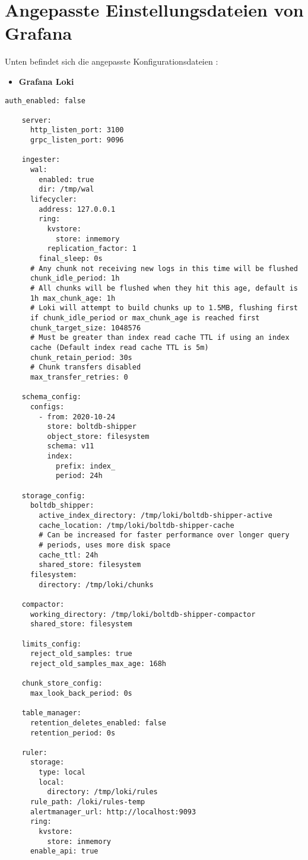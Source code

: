 \section{Angepasste Einstellungsdateien von Grafana}\label{appendix:AngepasstGrafana}

Unten befindet sich die angepasste Konfigurationsdateien \citep{Polinowski_PGL}:

\begin{itemize}[noitemsep]
    \item \textbf{Grafana Loki}
\end{itemize}

{
\begin{Verbatim}[frame=single]
    auth_enabled: false

    server:
      http_listen_port: 3100
      grpc_listen_port: 9096
    
    ingester:
      wal:
        enabled: true
        dir: /tmp/wal
      lifecycler:
        address: 127.0.0.1
        ring:
          kvstore:
            store: inmemory
          replication_factor: 1
        final_sleep: 0s
      # Any chunk not receiving new logs in this time will be flushed
      chunk_idle_period: 1h  
      # All chunks will be flushed when they hit this age, default is 
      1h max_chunk_age: 1h           
      # Loki will attempt to build chunks up to 1.5MB, flushing first 
      if chunk_idle_period or max_chunk_age is reached first
      chunk_target_size: 1048576  
      # Must be greater than index read cache TTL if using an index 
      cache (Default index read cache TTL is 5m)
      chunk_retain_period: 30s    
      # Chunk transfers disabled
      max_transfer_retries: 0     
    
    schema_config:
      configs:
        - from: 2020-10-24
          store: boltdb-shipper
          object_store: filesystem
          schema: v11
          index:
            prefix: index_
            period: 24h
    
    storage_config:
      boltdb_shipper:
        active_index_directory: /tmp/loki/boltdb-shipper-active
        cache_location: /tmp/loki/boltdb-shipper-cache
        # Can be increased for faster performance over longer query 
        # periods, uses more disk space
        cache_ttl: 24h        
        shared_store: filesystem
      filesystem:
        directory: /tmp/loki/chunks
    
    compactor:
      working_directory: /tmp/loki/boltdb-shipper-compactor
      shared_store: filesystem
    
    limits_config:
      reject_old_samples: true
      reject_old_samples_max_age: 168h
    
    chunk_store_config:
      max_look_back_period: 0s
    
    table_manager:
      retention_deletes_enabled: false
      retention_period: 0s
    
    ruler:
      storage:
        type: local
        local:
          directory: /tmp/loki/rules
      rule_path: /loki/rules-temp
      alertmanager_url: http://localhost:9093
      ring:
        kvstore:
          store: inmemory
      enable_api: true
\end{Verbatim}
}

